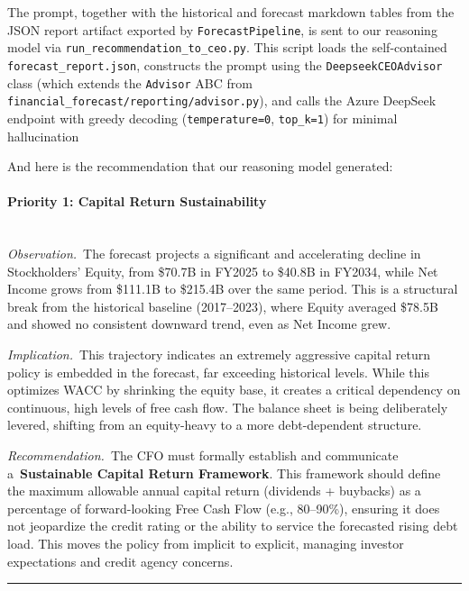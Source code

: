 \documentclass[12pt,a4paper]{article}
\begin{document}
The prompt, together with the historical and forecast markdown tables
from the JSON report artifact exported by \texttt{ForecastPipeline}, is
sent to our reasoning model via \texttt{run\_recommendation\_to\_ceo.py}.
This script loads the self-contained \texttt{forecast\_report.json},
constructs the prompt using the \texttt{DeepseekCEOAdvisor} class (which
extends the \texttt{Advisor} ABC from \texttt{financial\_forecast/reporting/advisor.py}),
and calls the Azure DeepSeek endpoint with greedy decoding
(\texttt{temperature=0}, \texttt{top\_k=1}) for minimal hallucination

And here is the recommendation that our reasoning model generated:

\begin{llmoutput}

\paragraph{Priority 1: Capital Return Sustainability}\mbox{}\\
\textit{Observation.}~The forecast projects a significant and
accelerating decline in Stockholders'{} Equity, from
\$70.7B in FY2025 to \$40.8B in FY2034, while Net Income grows from
\$111.1B to \$215.4B over the same period. This is a structural break
from the historical baseline (2017--2023), where Equity averaged \$78.5B
and showed no consistent downward trend, even as Net Income grew.

\textit{Implication.}~This trajectory indicates an extremely aggressive
capital return policy is embedded in the forecast, far exceeding
historical levels. While this optimizes WACC by shrinking the equity
base, it creates a critical dependency on continuous, high levels of
free cash flow. The balance sheet is being deliberately levered,
shifting from an equity-heavy to a more debt-dependent structure.

\textit{Recommendation.}~The CFO must formally establish and communicate
a~\textbf{Sustainable Capital Return Framework}. This framework should
define the maximum allowable annual capital return (dividends +
buybacks) as a percentage of forward-looking Free Cash Flow (e.g.,
80--90\%), ensuring it does not jeopardize the credit rating or the
ability to service the forecasted rising debt load. This moves the
policy from implicit to explicit, managing investor expectations and
credit agency concerns.

\noindent\rule{\linewidth}{0.3pt}


\end{llmoutput}
\end{document}
